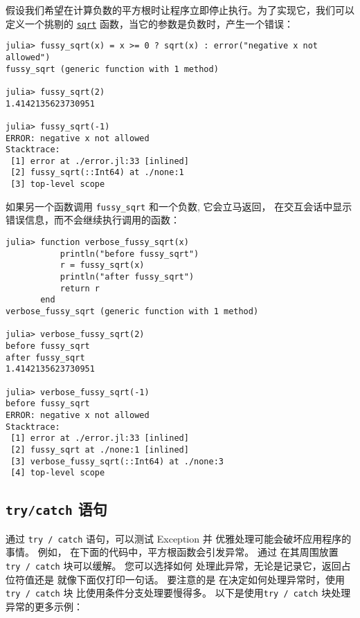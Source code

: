 假设我们希望在计算负数的平方根时让程序立即停止执行。为了实现它，我们可以定义一个挑剔的 \hyperlink{4551113327515323898}{\texttt{sqrt}} 函数，当它的参数是负数时，产生一个错误：




\begin{verbatim}
julia> fussy_sqrt(x) = x >= 0 ? sqrt(x) : error("negative x not allowed")
fussy_sqrt (generic function with 1 method)

julia> fussy_sqrt(2)
1.4142135623730951

julia> fussy_sqrt(-1)
ERROR: negative x not allowed
Stacktrace:
 [1] error at ./error.jl:33 [inlined]
 [2] fussy_sqrt(::Int64) at ./none:1
 [3] top-level scope
\end{verbatim}



如果另一个函数调用 \texttt{fussy\_sqrt} 和一个负数, 它会立马返回， 在交互会话中显示错误信息，而不会继续执行调用的函数：




\begin{verbatim}
julia> function verbose_fussy_sqrt(x)
           println("before fussy_sqrt")
           r = fussy_sqrt(x)
           println("after fussy_sqrt")
           return r
       end
verbose_fussy_sqrt (generic function with 1 method)

julia> verbose_fussy_sqrt(2)
before fussy_sqrt
after fussy_sqrt
1.4142135623730951

julia> verbose_fussy_sqrt(-1)
before fussy_sqrt
ERROR: negative x not allowed
Stacktrace:
 [1] error at ./error.jl:33 [inlined]
 [2] fussy_sqrt at ./none:1 [inlined]
 [3] verbose_fussy_sqrt(::Int64) at ./none:3
 [4] top-level scope
\end{verbatim}



\hypertarget{11842305126309838851}{}


\subsection{\texttt{try/catch} 语句}



通过 \texttt{try / catch} 语句，可以测试 Exception 并 优雅处理可能会破坏应用程序的事情。 例如， 在下面的代码中，平方根函数会引发异常。 通过 在其周围放置 \texttt{try / catch} 块可以缓解。 您可以选择如何 处理此异常，无论是记录它，返回占位符值还是 就像下面仅打印一句话。 要注意的是 在决定如何处理异常时，使用\texttt{try / catch} 块 比使用条件分支处理要慢得多。 以下是使用\texttt{try / catch} 块处理异常的更多示例：




